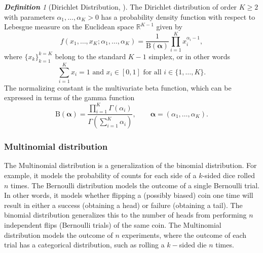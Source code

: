 \documentclass[12pt,oneside,a4paper]{book}
\theoremstyle{definition}
\theoremstyle{remark}
\newtheorem{defn}{\bf Definition}[subsection]
\begin{document}
				\begin{defn}[Dirichlet Distribution, \cite{Minka2012EstimatingAD}]
						The Dirichlet distribution of order $K \ge 2$ with parameters $\alpha_1, \dots, \alpha_K > 0$ has a probability density function with respect to Lebesgue measure on the Euclidean space $\mathbb{R}^{K-1}$ given by
						\begin{equation}
							f\left(x_{1},\ldots ,x_{K};\alpha _{1},\ldots ,\alpha _{K}\right)={\frac {1}{\mathrm {B} ({\boldsymbol {\alpha }})}}\prod _{i=1}^{K}x_{i}^{\alpha _{i}-1},
						\end{equation}
						where $\{x_{k}\}_{k=1}^{k=K}$ belong to the standard $K-1$ simplex, or in other words
						\begin{equation}
							\sum _{i=1}^{K}x_{i}=1{\mbox{ and }}x_{i}\in \left[0,1\right]{\mbox{ for all }}i\in \{1,\dots ,K\}.
						\end{equation}
						The normalizing constant is the multivariate beta function, which can be expressed in terms of the gamma function
						\begin{equation}
							\mathrm {B} ({\boldsymbol {\alpha }}) = {
								\frac {\prod \limits _{i=1}^{K}\Gamma (\alpha _{i})}
								{\Gamma \left(\sum \limits _{i=1}^{K}\alpha _{i}\right)}},
							\qquad {\boldsymbol {\alpha }}=(\alpha _{1},\ldots ,\alpha _{K}).
						\end{equation}
					\end{defn}
				\subsubsection{Multinomial distribution}
					The Multinomial distribution is a generalization of the binomial distribution. For example, it models the probability of counts for each side of a $k$-sided dice rolled $n$ times.
					The Bernoulli distribution models the outcome of a single Bernoulli trial. In other words, it models whether flipping a (possibly biased) coin one time will result in either a success (obtaining a head) or failure (obtaining a tail). The binomial distribution generalizes this to the number of heads from performing $n$ independent flips (Bernoulli trials) of the same coin. The Multinomial distribution models the outcome of $n$ experiments, where the outcome of each trial has a categorical distribution, such as rolling a $k-$sided die $n$ times.
\end{document}
